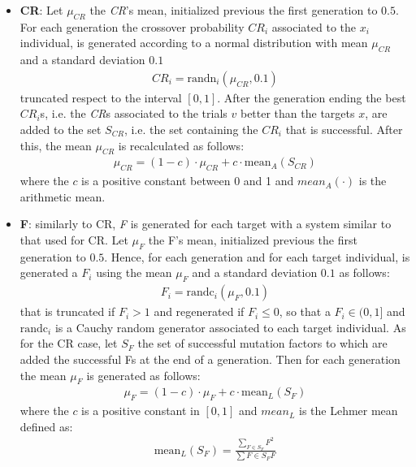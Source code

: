 \begin{itemize}
	\item{\textbf{CR}: Let $\mu_{\textit{CR}}$ the \textit{CR}'s mean, initialized previous the first generation to $0.5$. For each generation the crossover probability $\textit{CR}_{i}$ associated to the $x_{i}$ individual, is generated according to a normal distribution with mean $\mu_{CR}$ and a standard deviation $0.1$
	\begin{align}
		\textit{CR}_{i} = \textrm{randn}_{i}(\mu_{\textit{CR}}, 0.1)
	\end{align}
	truncated respect to the interval $[0, 1]$. \newline\newline
	After the generation ending the best $\textit{CR}_{i}$s, i.e. the \textit{CR}s associated to the trials $v$ better than the targets $x$, are added to the set $S_{\textit{CR}}$, i.e. the set containing the $\textit{CR}_{i}$ that is successful. After this, the mean $\mu_{\textit{CR}}$ is recalculated as follows:
	\begin{align}
		\mu_{\textit{CR}} = (1 - c)\cdot\mu_{\textit{CR}} + c\cdot\textrm{mean}_{A}(S_{\textit{CR}})
	\end{align}
	where the $c$ is a positive constant between 0 and 1 and $mean_{A}(\cdot)$ is the arithmetic mean.	
	}
	\item{\textbf{F}: similarly to CR, \textit{F} is generated for each target with a system similar to that used for CR. Let $\mu_{F}$ the F's mean, initialized previous the first generation to $0.5$. Hence, for each generation and for each target individual, is generated a $F_{i}$ using the mean $\mu_{F}$ and a standard deviation $0.1$ as follows:
		\begin{align}
			F_{i} = \textrm{randc}_{i}(\mu_{F}, 0.1)
		\end{align}
		that is truncated if $F_{i} > 1$ and regenerated if $F_{i} \leq 0$, so that a $F_{i} \in (0, 1]$ and $\textrm{randc}_{i}$ is a Cauchy random generator associated to each target individual.\newline\newline
As for the CR case, let $S_{\textit{F}}$ the set of successful mutation factors to which are added the successful Fs at the end of a generation. Then for each generation the mean $\mu_{F}$ is generated as follows:
		\begin{align}
			\mu_{F} = (1 - c)\cdot\mu_{F} + c\cdot\textrm{mean}_{L}(S_{F})
		\end{align}
		where the $c$ is a positive constant in $[0, 1]$ and $\textit{mean}_{L}$ is the Lehmer mean defined as:
		\begin{align}
			\textrm{mean}_{L}(S_{F}) = \frac{\sum_{F \in S_{F}}F^{2}}{\sum\limits{F \in S_{F}}F} 
		\end{align}
		}
\end{itemize}

